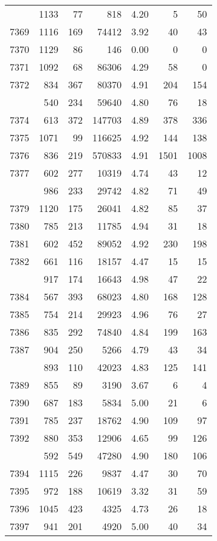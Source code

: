\documentclass[
]{article}
\begin{document}
\begin{table}
\begin{tabular}[t]{lrrrrrr}
\addlinespace
7368 & 1133 & 77 & 818 & 4.20 & 5 & 50\\
7369 & 1116 & 169 & 74412 & 3.92 & 40 & 43\\
7370 & 1129 & 86 & 146 & 0.00 & 0 & 0\\
7371 & 1092 & 68 & 86306 & 4.29 & 58 & 0\\
7372 & 834 & 367 & 80370 & 4.91 & 204 & 154\\
\addlinespace
7373 & 540 & 234 & 59640 & 4.80 & 76 & 18\\
7374 & 613 & 372 & 147703 & 4.89 & 378 & 336\\
7375 & 1071 & 99 & 116625 & 4.92 & 144 & 138\\
7376 & 836 & 219 & 570833 & 4.91 & 1501 & 1008\\
7377 & 602 & 277 & 10319 & 4.74 & 43 & 12\\
\addlinespace
7378 & 986 & 233 & 29742 & 4.82 & 71 & 49\\
7379 & 1120 & 175 & 26041 & 4.82 & 85 & 37\\
7380 & 785 & 213 & 11785 & 4.94 & 31 & 18\\
7381 & 602 & 452 & 89052 & 4.92 & 230 & 198\\
7382 & 661 & 116 & 18157 & 4.47 & 15 & 15\\
\addlinespace
7383 & 917 & 174 & 16643 & 4.98 & 47 & 22\\
7384 & 567 & 393 & 68023 & 4.80 & 168 & 128\\
7385 & 754 & 214 & 29923 & 4.96 & 76 & 27\\
7386 & 835 & 292 & 74840 & 4.84 & 199 & 163\\
7387 & 904 & 250 & 5266 & 4.79 & 43 & 34\\
\addlinespace
7388 & 893 & 110 & 42023 & 4.83 & 125 & 141\\
7389 & 855 & 89 & 3190 & 3.67 & 6 & 4\\
7390 & 687 & 183 & 5834 & 5.00 & 21 & 6\\
7391 & 785 & 237 & 18762 & 4.90 & 109 & 97\\
7392 & 880 & 353 & 12906 & 4.65 & 99 & 126\\
\addlinespace
7393 & 592 & 549 & 47280 & 4.90 & 180 & 106\\
7394 & 1115 & 226 & 9837 & 4.47 & 30 & 70\\
7395 & 972 & 188 & 10619 & 3.32 & 31 & 59\\
7396 & 1045 & 423 & 4325 & 4.73 & 26 & 18\\
7397 & 941 & 201 & 4920 & 5.00 & 40 & 34\\

\end{tabular}
\end{table}
\end{document}
